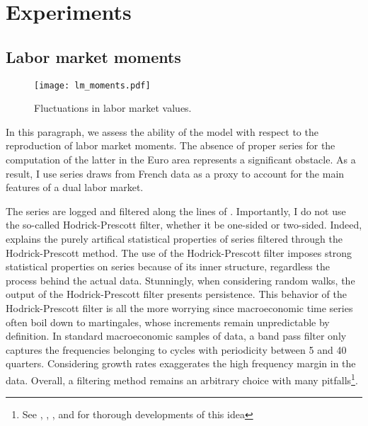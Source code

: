 
\section{Experiments}

\subsection{Labor market moments}

\begin{figure}[t]
\begin{center}
\texttt{[image: lm\_moments.pdf]}
\caption{Fluctuations in labor market values.}
\label{fluctuations}
\end{center}
\end{figure}

In this paragraph, we assess the ability of the model with respect to the reproduction of labor market moments. The absence of proper series for the computation of the latter in the Euro area represents a significant obstacle. As a result, I use series draws from French data as a proxy to account for the main features of a dual labor market.

The series are logged and filtered along the lines of \citet{hamilton2018you}. Importantly, I do not use the so-called Hodrick-Prescott filter, whether it be one-sided or two-sided. Indeed, \citet{hamilton2018you} explains the purely artifical statistical properties of series filtered through the Hodrick-Prescott method. The use of the Hodrick-Prescott filter imposes strong statistical properties on series because of its inner structure, regardless the process behind the actual data. Stunningly, when considering random walks, the output of the Hodrick-Prescott filter presents persistence. This behavior of the Hodrick-Prescott filter is all the more worrying since macroeconomic time series often boil down to martingales, whose increments remain unpredictable by definition. In standard macroeconomic samples of data, a band pass filter only captures the frequencies belonging to cycles with periodicity between 5 and 40 quarters. Considering growth rates exaggerates the high frequency margin in the data. Overall, a filtering method remains an arbitrary choice with many pitfalls\footnote{See \citet{gorodnichenko2010estimation}, \citet{ferroni2011trend}, \citet{lafourcade2012taking}, \citet{canova2014bridging} and \citet{hamilton2018you} for thorough developments of this idea}.

